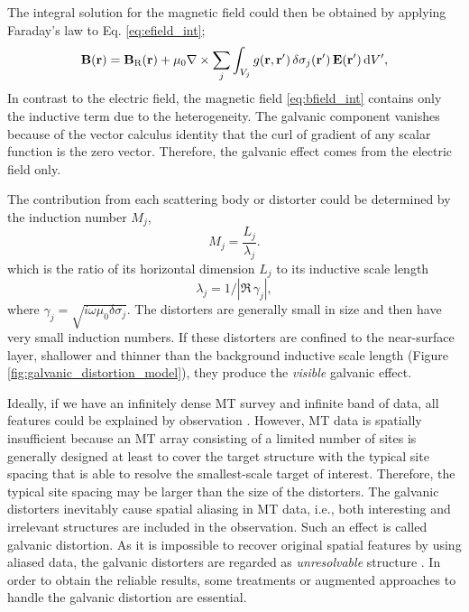 			The integral solution for the magnetic field could then be obtained by applying Faraday's law to Eq. \eqref{eq:efield_int};
			\begin{equation}\label{eq:bfield_int}
				\Bbf\fxr = \Bbf_\Regional\fxr + \mu_0 \curl \sum_j \int_{V_j} g(\rbf,\rbf')\,\delta\sigma_j(\rbf')\,\Ebf(\rbf')\, \dwrt V', 
			\end{equation}
			In contrast to the electric field, the magnetic field \eqref{eq:bfield_int} contains only the inductive term due to the heterogeneity. The galvanic component vanishes because of the vector calculus identity that the curl of gradient of any scalar function is the zero vector. Therefore, the galvanic effect comes from the electric field only.
			
			The contribution from each scattering body or distorter could be determined by the induction number $M_j$, 
			\begin{equation}
				M_j = \frac{L_j}{\lambda_j}.
			\end{equation}
			which is the ratio of its horizontal dimension $L_j$ to its inductive scale length 
			\begin{equation}\label{eq:idl_anomaly}
				\lambda_j=1/|\Re\,\gamma_j|,
			\end{equation}
			where $\gamma_j=\sqrt{i\omega\mu_0\delta\sigma_j}$.
%
			The distorters are generally small in size and then have very small induction numbers.
				If these distorters are confined to the near-surface layer, shallower and thinner than the background inductive scale length (Figure \ref{fig:galvanic_distortion_model}), they produce the \emph{visible} galvanic effect. 
			
			Ideally, if we  have an infinitely dense MT survey and infinite band of data, all features could be explained by observation \citep{utada2000a}.			
			However, MT data is spatially insufficient because an MT array consisting of a limited number of sites is generally designed at least to cover the target structure with the typical site spacing that is able to resolve the smallest-scale target of interest.
			Therefore, the typical site spacing may be larger than the size of the distorters.
			The galvanic distorters inevitably cause spatial aliasing in MT data, i.e., both interesting and irrelevant structures are included in the observation. Such an effect is called galvanic distortion. 
			As it is impossible to recover original spatial features by using aliased data, the galvanic distorters are regarded as \emph{unresolvable} structure \citep{booker2014a}. In order to obtain the reliable results, some treatments or augmented approaches to handle the galvanic distortion are essential.
		
